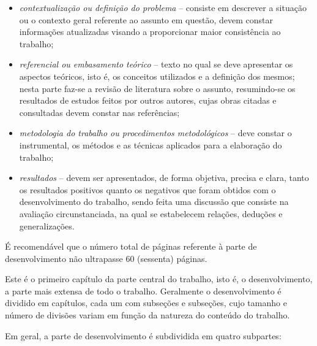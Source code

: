 \begin{itemize}
   \item \textit{contextualização ou definição do problema} -- consiste em
   descrever a situação ou o contexto geral referente ao assunto em questão,
   devem constar informações atualizadas visando a proporcionar maior
   consistência ao trabalho;
   \item \textit{referencial ou embasamento teórico} -- texto no qual se deve
   apresentar os aspectos teóricos, isto é, os conceitos utilizados e a
   definição dos mesmos; nesta parte faz-se a revisão de literatura sobre o
   assunto, resumindo-se os resultados de estudos feitos por outros autores,
   cujas obras citadas e consultadas devem constar nas referências;
   \item \textit{metodologia do trabalho ou procedimentos metodológicos} -- deve
   constar o instrumental, os métodos e as técnicas aplicados para a elaboração
   do trabalho;
   \item \textit{resultados} -- devem ser apresentados, de forma objetiva,
   precisa e clara, tanto os resultados positivos quanto os negativos que foram
   obtidos com o desenvolvimento do trabalho, sendo feita uma discussão que
   consiste na avaliação circunstanciada, na qual se estabelecem relações,
   deduções e generalizações.
\end{itemize}

É recomendável que o número total de páginas referente à parte de
 desenvolvimento não ultrapasse 60 (sessenta) páginas.


Este é o primeiro capítulo da parte central do trabalho, isto é, o
desenvolvimento, a parte mais extensa de todo o trabalho. Geralmente o
desenvolvimento é dividido em capítulos, cada um com subseções e subseções,
cujo tamanho e número de divisões variam em função da natureza do conteúdo do
trabalho.

Em geral, a parte de desenvolvimento é subdividida em quatro subpartes:

